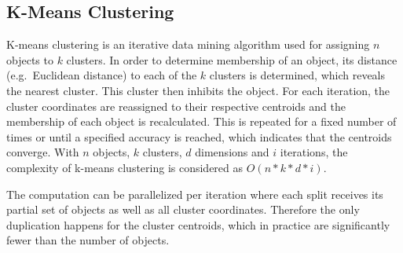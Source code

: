 \subsection*{K-Means Clustering}

K-means clustering is an iterative data mining algorithm used for assigning $n$ objects to $k$ clusters\cite{kmeans_paper}. In order to determine membership of an object, its distance (e.g.~Euclidean distance) to each of the $k$ clusters is determined, which reveals the nearest cluster. This cluster then inhibits the object. For each iteration, the cluster coordinates are reassigned to their respective centroids and the membership of each object is recalculated. This is repeated for a fixed number of times or until a specified accuracy is reached, which indicates that the centroids converge. With $n$ objects, $k$ clusters, $d$ dimensions and $i$ iterations, the complexity of k-means clustering is considered as $O(n*k*d*i)$.

The computation can be parallelized per iteration where each split receives its partial set of objects as well as all cluster coordinates. Therefore the only duplication happens for the cluster centroids, which in practice are significantly fewer than the number of objects.
